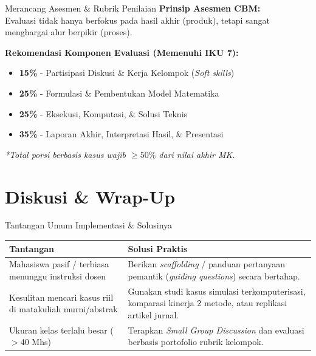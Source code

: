 \documentclass[aspectratio=169]{beamer} %
\begin{document}
\begin{frame}{Merancang Asesmen \& Rubrik Penilaian}
    \textbf{Prinsip Asesmen CBM:}\\ 
    Evaluasi tidak hanya berfokus pada hasil akhir (produk), tetapi sangat menghargai alur berpikir (proses).
    
    \vspace{0.4cm}
    \textbf{Rekomendasi Komponen Evaluasi (Memenuhi IKU 7):}
    \begin{itemize}
        \item \textbf{15\%} - Partisipasi Diskusi \& Kerja Kelompok (\textit{Soft skills})
        \item \textbf{25\%} - Formulasi \& Pembentukan Model Matematika
        \item \textbf{25\%} - Eksekusi, Komputasi, \& Solusi Teknis
        \item \textbf{35\%} - Laporan Akhir, Interpretasi Hasil, \& Presentasi
    \end{itemize}
    \vspace{0.2cm}
    \textit{*Total porsi berbasis kasus wajib $\ge 50\%$ dari nilai akhir MK.}
\end{frame}

\section{Diskusi \& Wrap-Up}

\begin{frame}{Tantangan Umum Implementasi \& Solusinya}

\begin{table}
	\renewcommand{\arraystretch}{1.3}
	\setlength{\tabcolsep}{10pt}
	\begin{tabular}{p{5cm} p{8cm}}
		\toprule
		\textbf{Tantangan} & \textbf{Solusi Praktis} \\
		\midrule
		Mahasiswa pasif / terbiasa menunggu instruksi dosen & Berikan \textit{scaffolding} / panduan pertanyaan pemantik (\textit{guiding questions}) secara bertahap. \\
        Kesulitan mencari kasus riil di matakuliah murni/abstrak & Gunakan studi kasus simulasi terkomputerisasi, komparasi kinerja 2 metode, atau replikasi artikel jurnal. \\
        Ukuran kelas terlalu besar ($>$40 Mhs) & Terapkan \textit{Small Group Discussion} dan evaluasi berbasis portofolio rubrik kelompok. \\
		\bottomrule
	\end{tabular}
\end{table}

\end{frame}
\end{document}
